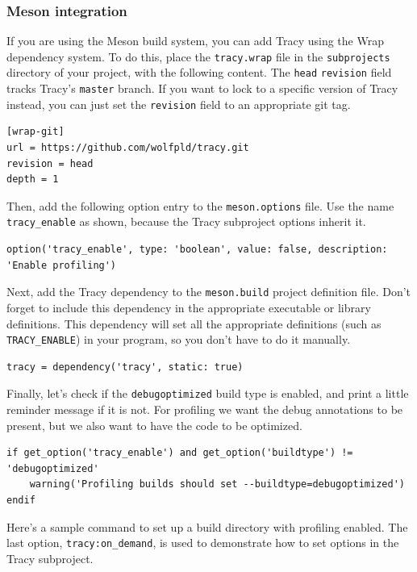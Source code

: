\documentclass[hidelinks,titlepage,a4paper,twoside]{article}
\begin{document}
\subsubsection{Meson integration}

If you are using the Meson build system, you can add Tracy using the Wrap dependency system. To do this, place the \texttt{tracy.wrap} file in the \texttt{subprojects} directory of your project, with the following content. The \texttt{head} \texttt{revision} field tracks Tracy's \texttt{master} branch. If you want to lock to a specific version of Tracy instead, you can just set the \texttt{revision} field to an appropriate git tag.

\begin{lstlisting}
[wrap-git]
url = https://github.com/wolfpld/tracy.git
revision = head
depth = 1
\end{lstlisting}

Then, add the following option entry to the \texttt{meson.options} file. Use the name \texttt{tracy\_enable} as shown, because the Tracy subproject options inherit it.

\begin{lstlisting}
option('tracy_enable', type: 'boolean', value: false, description: 'Enable profiling')
\end{lstlisting}

Next, add the Tracy dependency to the \texttt{meson.build} project definition file. Don't forget to include this dependency in the appropriate executable or library definitions. This dependency will set all the appropriate definitions (such as \texttt{TRACY\_ENABLE}) in your program, so you don't have to do it manually.

\begin{lstlisting}
tracy = dependency('tracy', static: true)
\end{lstlisting}

Finally, let's check if the \texttt{debugoptimized} build type is enabled, and print a little reminder message if it is not. For profiling we want the debug annotations to be present, but we also want to have the code to be optimized.

\begin{lstlisting}
if get_option('tracy_enable') and get_option('buildtype') != 'debugoptimized'
    warning('Profiling builds should set --buildtype=debugoptimized')
endif
\end{lstlisting}

Here's a sample command to set up a build directory with profiling enabled. The last option, \texttt{tracy:on\_demand}, is used to demonstrate how to set options in the Tracy subproject.
\end{document}
